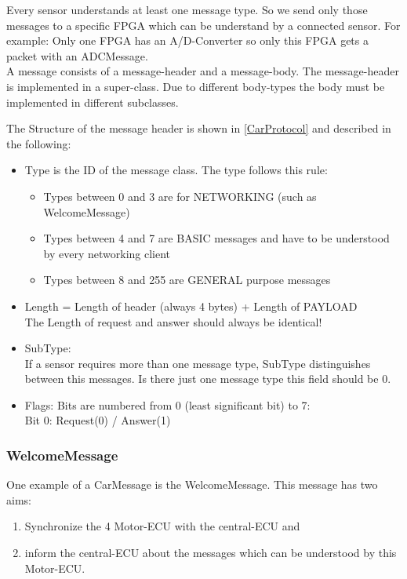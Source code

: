 Every sensor understands at least one message type. So we send only those messages to a specific FPGA which can be understand by a connected sensor. For example: Only one FPGA has an A/D-Converter so only this FPGA gets a packet with an ADCMessage.\\

A message consists of a message-header and a message-body. The message-header is implemented in a super-class. Due to different body-types the body must be implemented in different subclasses.

The Structure of the message header is shown in \ref{CarProtocol} and described in the following:

\begin{itemize}
\item Type is the ID of the message class. The type follows this rule:
	\begin{itemize}
		\item Types between 0 and 3 are for NETWORKING (such as WelcomeMessage)
		\item Types between 4 and 7 are BASIC messages and have to be understood by every networking client
		\item Types between 8 and 255 are GENERAL purpose messages
	\end{itemize}

\item Length = Length of header (always 4 bytes) + Length of PAYLOAD\\
The Length of request and answer should always be identical!

\item SubType:\\
If a sensor requires more than one message type, SubType distinguishes between this messages. Is there just one message type this field should be 0.

\item Flags: Bits are numbered from 0 (least significant bit) to 7:\\
Bit 0:  Request(0) / Answer(1)
\end{itemize}

\subsubsection{WelcomeMessage}

One example of a CarMessage is the WelcomeMessage. This message has two aims:
\begin{enumerate}
\item Synchronize the 4 Motor-ECU with the central-ECU and
\item inform the central-ECU about the messages which can be understood by this Motor-ECU.
\end{enumerate}

